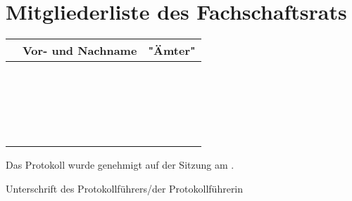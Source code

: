 \documentclass[sitzung=fsv-konstituierend,entwurf]{fsphys-protokoll}
\begin{document}
\section{Mitgliederliste des Fachschaftsrats}
\setcounter{fsr}{0}
\begin{longtable}{| r @{ } l | >{\raggedright\arraybackslash}m{10cm} |}
	\hline
	& Vor- und Nachname & "Ämter"
	\\ \hline\hline
	\endhead
	\fsrnum & 
	&
	\\ \hline
	\fsrnum & 
	&
	\\ \hline
	\fsrnum & 
	&
	\\ \hline
	\fsrnum & 
	&
	\\ \hline
	\fsrnum & 
	&
	\\ \hline
	\fsrnum & 
	&
	\\ \hline
	\fsrnum & 
	&
	\\ \hline
	\fsrnum & 
	&
	\\ \hline
	\fsrnum & 
	&
	\\ \hline
	\fsrnum & 
	&
	\\ \hline
	\fsrnum & 
	&
	\\ \hline
	\fsrnum & 
	&
	\\ \hline
	\fsrnum & 
	&
	\\ \hline
	\fsrnum & 
	&
	\\ \hline
	\fsrnum & 
	&
	\\ \hline
	\fsrnum & 
	&
	\\ \hline
	\fsrnum & 
	&
	\\ \hline
	\fsrnum & 
	&
	\\ \hline
	\fsrnum & 
	&
	\\ \hline
	\fsrnum & 
	&
	\\ \hline
\end{longtable}

\bigskip
\bigskip
Das Protokoll wurde genehmigt auf der Sitzung am \protokollformatteddate.

\vspace{2cm}
Unterschrift des Protokollführers/der Protokollführerin
\end{document}
